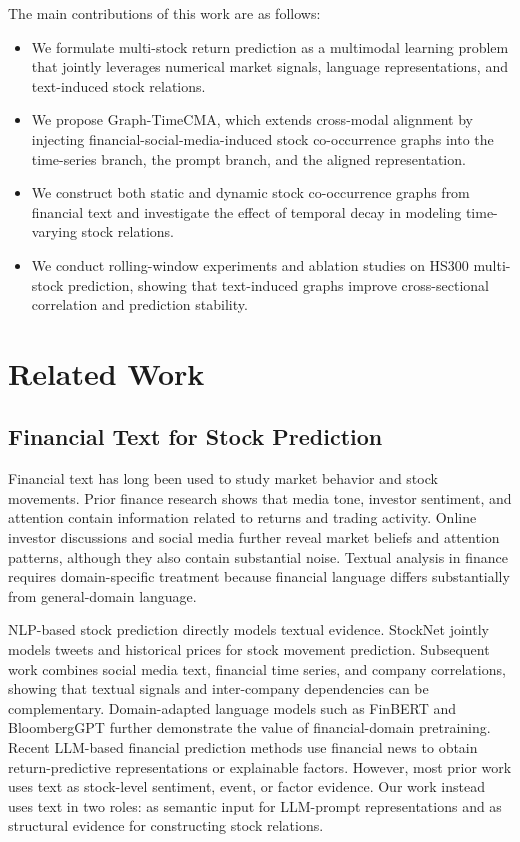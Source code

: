 \documentclass[11pt]{article}
\begin{document}
The main contributions of this work are as follows:
\begin{itemize}
    \item We formulate multi-stock return prediction as a multimodal learning problem that jointly leverages numerical market signals, language representations, and text-induced stock relations.
    \item We propose Graph-TimeCMA, which extends cross-modal alignment by injecting financial-social-media-induced stock co-occurrence graphs into the time-series branch, the prompt branch, and the aligned representation.
    \item We construct both static and dynamic stock co-occurrence graphs from financial text and investigate the effect of temporal decay in modeling time-varying stock relations.
    \item We conduct rolling-window experiments and ablation studies on HS300 multi-stock prediction, showing that text-induced graphs improve cross-sectional correlation and prediction stability.
\end{itemize}

\section{Related Work}

\subsection{Financial Text for Stock Prediction}

Financial text has long been used to study market behavior and stock movements. Prior finance research shows that media tone, investor sentiment, and attention contain information related to returns and trading activity. Online investor discussions and social media further reveal market beliefs and attention patterns, although they also contain substantial noise. Textual analysis in finance requires domain-specific treatment because financial language differs substantially from general-domain language.

NLP-based stock prediction directly models textual evidence. StockNet jointly models tweets and historical prices for stock movement prediction. Subsequent work combines social media text, financial time series, and company correlations, showing that textual signals and inter-company dependencies can be complementary. Domain-adapted language models such as FinBERT and BloombergGPT further demonstrate the value of financial-domain pretraining. Recent LLM-based financial prediction methods use financial news to obtain return-predictive representations or explainable factors. However, most prior work uses text as stock-level sentiment, event, or factor evidence. Our work instead uses text in two roles: as semantic input for LLM-prompt representations and as structural evidence for constructing stock relations.
\end{document}
